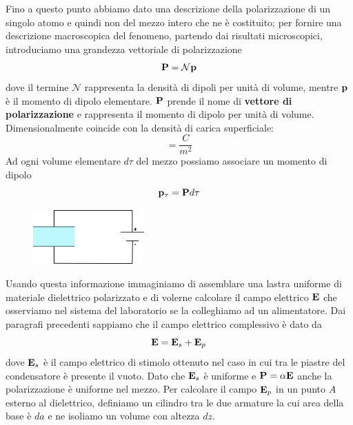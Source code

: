 Fino a questo punto abbiamo dato una descrizione della polarizzazione di un singolo atomo e quindi non del mezzo intero che ne \`e costituito; per fornire una descrizione macroscopica del fenomeno, partendo dai risultati microscopici, introduciamo una grandezza vettoriale di polarizzazione 
\begin{equation}
	\bold{P}  = \mathcal{N} \bold{p}
\end{equation}
dove il termine $\mathcal{N}$ rappresenta la densit\`a di dipoli per unit\`a di volume, mentre $\bold{p}$ \`e il momento di dipolo elementare. $\bold{P}$ prende il nome di \textbf{vettore di polarizzazione}  e rappresenta il momento di dipolo per unit\`a di volume. Dimensionalmente coincide con la densit\`a di carica superficiale:
\begin{equation*}
	[P] = \frac{C}{m^2}
\end{equation*}
Ad ogni volume elementare $d \tau $ del mezzo possiamo associare un momento di dipolo 
\begin{equation*}
	\bold{p}_{\tau} = \bold{P} d \tau
\end{equation*}
\begin{figure} %
    \centering
    \includegraphics[width=0.38\textwidth]{images/dielRC} %
\end{figure}
Usando questa informazione immaginiamo di assemblare una lastra uniforme di materiale dielettrico polarizzato e di volerne calcolare il campo elettrico $\bold{E}$ che osserviamo nel sistema del laboratorio se la colleghiamo ad un alimentatore.   Dai paragrafi precedenti sappiamo che il campo elettrico complessivo \`e dato da 
\begin{equation*}
	\bold{E} = \bold{E}_{s} + \bold{E}_{p}
\end{equation*}
dove $\bold{E}_{s}$ \`e il campo elettrico di stimolo ottenuto nel caso in cui tra le piastre del condensatore \`e presente il vuoto. Dato che $\bold{E}_{s}$ \`e uniforme e $\bold{P} = \alpha \bold{E}$ anche la polarizzazione \`e uniforme nel mezzo. Per calcolare il campo $\bold{E}_p$ in un punto $A$ esterno al dielettrico, definiamo un cilindro tra le due armature la cui area della base \`e $da$ e ne isoliamo un volume con altezza $dz$.

